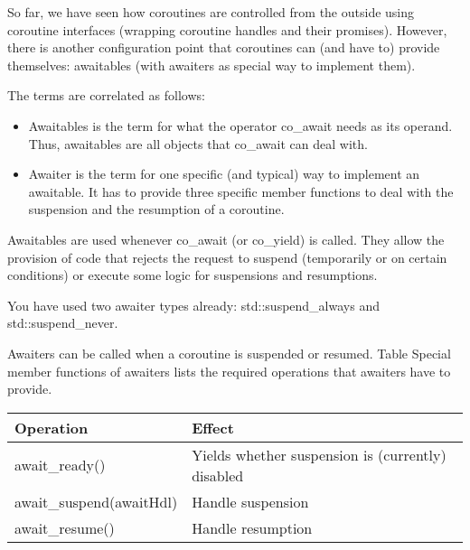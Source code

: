 

So far, we have seen how coroutines are controlled from the outside using coroutine interfaces (wrapping coroutine handles and their promises). However, there is another configuration point that coroutines can (and have to) provide themselves: awaitables (with awaiters as special way to implement them).

The terms are correlated as follows:

\begin{itemize}
\item 
Awaitables is the term for what the operator co\_await needs as its operand. Thus, awaitables are all objects that co\_await can deal with.

\item 
Awaiter is the term for one specific (and typical) way to implement an awaitable. It has to provide three specific member functions to deal with the suspension and the resumption of a coroutine.
\end{itemize}

Awaitables are used whenever co\_await (or co\_yield) is called. They allow the provision of code that rejects the request to suspend (temporarily or on certain conditions) or execute some logic for suspensions and resumptions.

You have used two awaiter types already: std::suspend\_always and std::suspend\_never.


Awaiters can be called when a coroutine is suspended or resumed. Table Special member functions of awaiters lists the required operations that awaiters have to provide.

\begin{longtable}[c]{|l|l|}
\hline
\textbf{Operation}       & \textbf{Effect}                                   \\ \hline
\endfirsthead
%
\endhead
%
await\_ready()           & Yields whether suspension is (currently) disabled \\ \hline
await\_suspend(awaitHdl) & Handle suspension                                 \\ \hline
await\_resume()          & Handle resumption                                 \\ \hline
\end{longtable}

